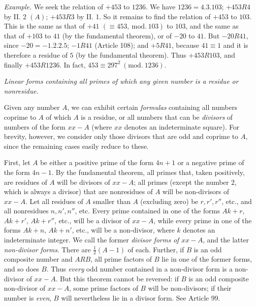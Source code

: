\textit{Example.} We seek the relation of $+453$ to $1236$. We have $1236=4.3.103$; $+453R4$ by II. 2 $(A)$; $+453R3$ by II. 1. So it remains to find the relation of $+453$ to $103$. This is the same as that of $+41$ $(\equiv453,\ \mathrm{mod.}\ 103)$ to $103$, and the same as that of $+103$ to $41$ (by the fundamental theorem), or of $-20$ to $41$. But $-20R41$, since $-20=-1.2.2.5$; $-1R41$ (Article 108); and $+5R41$, because $41\equiv1$ and it is therefore a residue of $5$ (by the fundamental theorem). Thus $+453R103$, and finally $+453R1236$. In fact, $453\equiv297^2\ (\mathrm{mod.}\ 1236)$.

\begin{center}\textit{Linear forms containing all primes of which any given number is a residue or nonresidue.}\end{center}

Given any number $A$, we can exhibit certain \textit{formulas} containing all numbers coprime to $A$ of which $A$ is a residue, or all numbers that can be \textit{divisors} of numbers of the form $xx-A$ (where $xx$ denotes an indeterminate square). For brevity, however, we consider only those divisors that are odd and coprime to $A$, since the remaining cases easily reduce to these.

First, let $A$ be either a positive prime of the form $4n+1$ or a negative prime of the form $4n-1$. By the fundamental theorem, all primes that, taken positively, are residues of $A$ will be divisors of $xx-A$; all primes (except the number $2$, which is always a divisor) that are nonresidues of $A$ will be non-divisors of $xx-A$. Let all residues of $A$ smaller than $A$ (excluding zero) be $r,r',r''$, etc., and all nonresidues $n,n',n''$, etc. Every prime contained in one of the forms $Ak+r$, $Ak+r'$, $Ak+r''$, etc., will be a divisor of $xx-A$, while every prime in one of the forms $Ak+n$, $Ak+n'$, etc., will be a non-divisor, where $k$ denotes an indeterminate integer. We call the former \textit{divisor forms of $xx-A$}, and the latter \textit{non-divisor forms}. There are $\frac{1}{2}(A-1)$ of each. Further, if $B$ is an odd composite number and $ARB$, all prime factors of $B$ lie in one of the former forms, and so does $B$. Thus \textit{every} odd number contained in a non-divisor form is a non-divisor of $xx-A$. But this theorem cannot be reversed: if $B$ is an odd composite non-divisor of $xx-A$, some prime factors of $B$ will be non-divisors; if their number is \textit{even}, $B$ will nevertheless lie in a divisor form. See Article 99.


